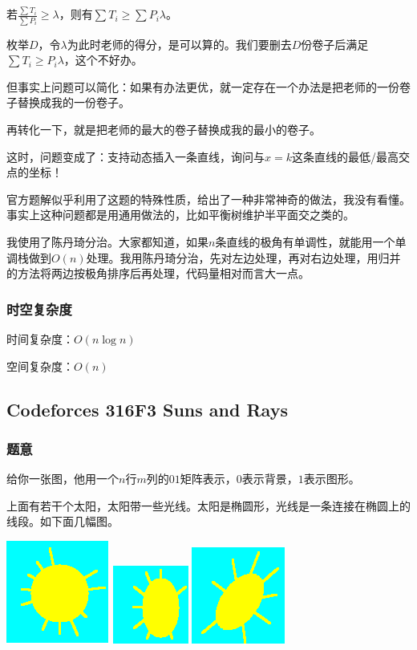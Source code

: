 \documentclass{ctexart}
\begin{document}
若$\frac{\sum T_i}{\sum P_i} \ge \lambda$，则有$\sum T_i \ge \sum P_i \lambda$。

枚举$D$，令$\lambda$为此时老师的得分，是可以算的。我们要删去$D$份卷子后满足$\sum T_i \ge P_i \lambda$，这个不好办。

但事实上问题可以简化：如果有办法更优，就一定存在一个办法是把老师的一份卷子替换成我的一份卷子。

再转化一下，就是把老师的最大的卷子替换成我的最小的卷子。

这时，问题变成了：支持动态插入一条直线，询问与$x=k$这条直线的最低/最高交点的坐标！

官方题解似乎利用了这题的特殊性质，给出了一种非常神奇的做法，我没有看懂。事实上这种问题都是用通用做法的，比如平衡树维护半平面交之类的。

我使用了陈丹琦分治。大家都知道，如果$n$条直线的极角有单调性，就能用一个单调栈做到$O(n)$处理。我用陈丹琦分治，先对左边处理，再对右边处理，用归并的方法将两边按极角排序后再处理，代码量相对而言大一点。
\subsubsection{时空复杂度}
时间复杂度：$O(n \log n)$

空间复杂度：$O(n)$
\subsection{Codeforces 316F3 Suns and Rays}
\subsubsection{题意}
给你一张图，他用一个$n$行$m$列的$01$矩阵表示，$0$表示背景，$1$表示图形。

上面有若干个太阳，太阳带一些光线。太阳是椭圆形，光线是一条连接在椭圆上的线段。如下面几幅图。

\includegraphics{SunRay1.png}
\includegraphics{SunRay2.png}
\includegraphics{SunRay3.png}
\end{document}
